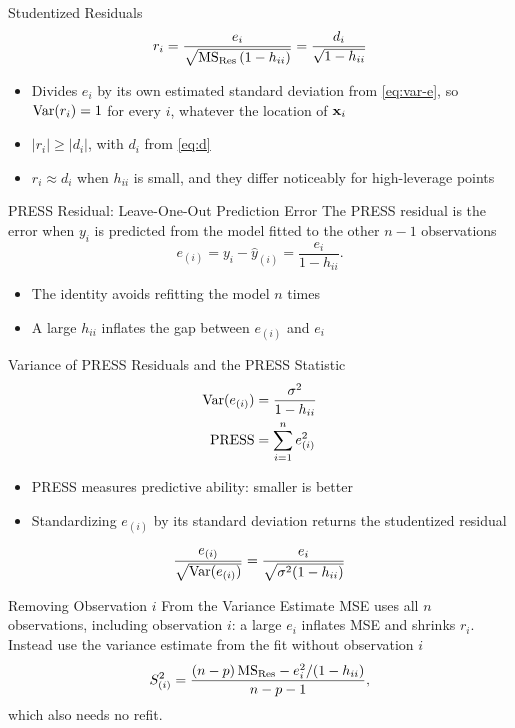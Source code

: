 \begin{frame}{Studentized Residuals}
    \begin{align}
        r_i = \frac{e_i}{\sqrt{\mathrm{MS}_{\mathrm{Res}}\,(1-h_{ii})}} = \frac{d_i}{\sqrt{1-h_{ii}}} \label{eq:r}
    \end{align}
    \begin{itemize}
        \item Divides $e_i$ by its own estimated standard deviation from \eqref{eq:var-e}, so $\operatorname{Var}(r_i)=1$ for every $i$, whatever the location of $\mathbf{x}_i$
        \item $|r_i|\ge|d_i|$, with $d_i$ from \eqref{eq:d}
        \item $r_i\approx d_i$ when $h_{ii}$ is small, and they differ noticeably for high-leverage points
    \end{itemize}
\end{frame}


\begin{frame}{PRESS Residual: Leave-One-Out Prediction Error}
    The PRESS residual is the error when $y_i$ is predicted from the model fitted to the other $n-1$ observations
    \[
        e_{(i)} = y_i-\hat y_{(i)} = \frac{e_i}{1-h_{ii}} .
    \]
    \begin{itemize}
        \item The identity avoids refitting the model $n$ times
        \item A large $h_{ii}$ inflates the gap between $e_{(i)}$ and $e_i$
    \end{itemize}
\end{frame}


\begin{frame}{Variance of PRESS Residuals and the PRESS Statistic}
    \begin{align*}
        \operatorname{Var}(e_{(i)}) &= \frac{\sigma^2}{1-h_{ii}} \\
        \mathrm{PRESS} &= \sum_{i=1}^n e_{(i)}^2
    \end{align*}
    \begin{itemize}
        \item PRESS measures predictive ability: smaller is better
        \item Standardizing $e_{(i)}$ by its standard deviation returns the studentized residual
    \end{itemize}
    \[
        \frac{e_{(i)}}{\sqrt{\operatorname{Var}(e_{(i)})}} = \frac{e_i}{\sqrt{\sigma^2(1-h_{ii})}}
    \]
\end{frame}


\begin{frame}{Removing Observation $i$ From the Variance Estimate}
    MSE uses all $n$ observations, including observation $i$: a large $e_i$ inflates MSE and shrinks $r_i$. Instead use the variance estimate from the fit without observation $i$
    \begin{align}
        S_{(i)}^2 = \frac{(n-p)\,\mathrm{MS}_{\mathrm{Res}} - e_i^2/(1-h_{ii})}{n-p-1} , \label{eq:s2i}
    \end{align}
    which also needs no refit.
\end{frame}


